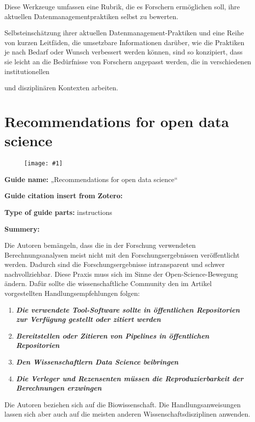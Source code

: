 \documentclass{article}
\newlength{\imgwidth}
\newcommand\scaledgraphics[2]{%
                
\settowidth{\imgwidth}{\texttt{[image: \#1]}}%
                
\setlength{\imgwidth}{\minof{\imgwidth}{#2\textwidth}}%
                
\texttt{[image: \#1]}%
                
}
\begin{document}
Diese Werkzeuge umfassen eine Rubrik, die es Forschern ermöglichen soll, ihre aktuellen Datenmanagementpraktiken selbst zu bewerten.


Selbsteinschätzung ihrer aktuellen Datenmanagement-Praktiken und eine Reihe von kurzen Leitfäden, die umsetzbare Informationen darüber, wie die Praktiken je nach Bedarf oder Wunsch verbessert werden können, sind so konzipiert, dass sie leicht an die Bedürfnisse von Forschern angepasst werden, die in verschiedenen institutionellen


und disziplinären Kontexten arbeiten.





\section{ Recommendations for open data science}\label{H2986141}





\begin{figure}
\scaledgraphics{10e3bc75-5c14-48e3-a161-d685105f455b.png}{1}
\label{F57414871}
\end{figure}





\textbf{Guide name:} „Recommendations for open data science“


\textbf{Guide citation insert from Zotero:} \autocite{gymrek_recommendations_2016}


\textbf{Type of guide parts:} instructions


\textbf{Summery:}


Die Autoren bemängeln, dass die in der Forschung verwendeten Berechnungsanalysen meist nicht mit den Forschungsergebnissen veröffentlicht werden. Dadurch sind die Forschungsergebnisse intransparent und schwer nachvollziehbar. Diese Praxis muss sich im Sinne der Open-Science-Bewegung ändern. Dafür sollte die wissenschaftliche Community den im Artikel vorgestellten Handlungsempfehlungen folgen:

\begin{enumerate}
\item \emph{\textbf{Die verwendete Tool-Software sollte in öffentlichen Repositorien zur Verfügung gestellt oder zitiert werden}}


\item \emph{\textbf{Bereitstellen oder Zitieren von Pipelines in öffentlichen Repositorien}}


\item \emph{\textbf{Den Wissenschaftlern Data Science beibringen}}


\item \emph{\textbf{Die Verleger und Rezensenten müssen die Reproduzierbarkeit der Berechnungen erzwingen}}


\end{enumerate}

Die Autoren beziehen sich auf die Biowissenschaft. Die Handlungsanweisungen lassen sich aber auch auf die meisten anderen Wissenschaftsdisziplinen anwenden.








\printbibliography[title={Literaturverzeichnis}]
\end{document}
